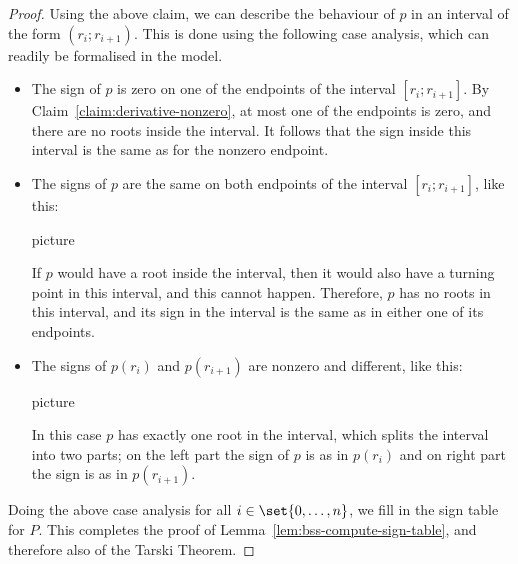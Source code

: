 \begin{proof}
Using the above claim, we can  describe the behaviour of $p$ in an interval of the form $(r_i;r_{i+1})$. This is done using the following case analysis, which can readily be formalised in the \bss model.
	\begin{itemize}
 		\item The sign of $p$ is zero on one of the endpoints of the interval $[r_i; r_{i+1}]$.  By Claim~\ref{claim:derivative-nonzero}, at most one of the endpoints is zero, and there are no roots inside the interval. It follows that  the sign inside this interval is the same as for the nonzero endpoint.  

		\item The signs of $p$ are the same on both  endpoints of the interval $[r_i; r_{i+1}]$, like this:
 		\begin{center}
 			picture
 		\end{center} If $p$ would have a root inside the interval, then it would also have a turning point in this interval, and this cannot happen. Therefore, $p$ has no roots in this interval, and its sign in the interval is the same as in either one of its endpoints. 
		\item The  signs of $p(r_i)$ and $p(r_{i+1})$ are nonzero and different, like this:
 		\begin{center}
 			picture
 		\end{center} In this case $p$ has exactly one root in the interval, which splits the interval into two parts; on the left part the sign of $p$ is  as in $p(r_i)$ and on right part the sign is as in $p(r_{i+1})$. 
	\end{itemize}
Doing the above case analysis for all $i \in \set{0,\ldots,n}$, we  fill in the sign table for $P$.  This completes the proof of Lemma~\ref{lem:bss-compute-sign-table}, and therefore also of the Tarski Theorem.
\end{proof}
